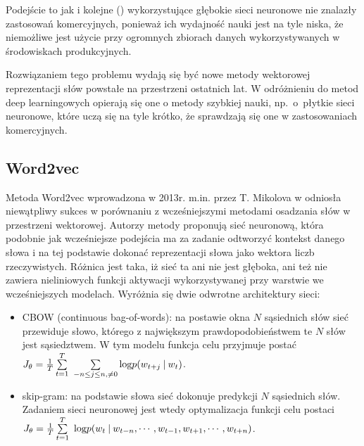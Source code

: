 \documentclass[pl]{minipw} %
\begin{document}
Podejście to jak i kolejne (\cite{c_w}) wykorzystujące głębokie sieci neuronowe nie znalazły zastosowań komercyjnych, ponieważ ich wydajność nauki jest na tyle  niska, że niemożliwe jest użycie przy ogromnych zbiorach danych wykorzystywanych w środowiskach produkcyjnych.


Rozwiązaniem tego problemu wydają się być nowe metody wektorowej reprezentacji słów powstałe na przestrzeni ostatnich lat. W odróżnieniu do metod deep learningowych opierają się one o metody szybkiej nauki, np.~o~płytkie sieci neuronowe, które uczą się na tyle krótko, że sprawdzają się one w zastosowaniach komercyjnych.


\subsection{Word2vec}%

Metoda Word2vec wprowadzona w 2013r. m.in. przez T. Mikolova w \cite{word2vec} odniosła niewątpliwy sukces w porównaniu z wcześniejszymi metodami osadzania słów w przestrzeni wektorowej. Autorzy metody proponują sieć neuronową, która podobnie jak wcześniejsze podejścia ma za zadanie odtworzyć kontekst danego słowa i na tej podstawie dokonać reprezentacji słowa jako wektora liczb rzeczywistych. Różnica jest taka, iż sieć ta ani nie jest głęboka, ani też nie zawiera nieliniowych funkcji aktywacji wykorzystywanej przy warstwie we wcześniejszych modelach. Wyróżnia się dwie odwrotne architektury sieci:
\begin{itemize}
	\item CBOW (continuous bag-of-words): na postawie okna $N$ sąsiednich słów sieć przewiduje słowo, którego z największym prawdopodobieństwem te $N$ słów jest sąsiedztwem. W tym modelu funkcja celu przyjmuje postać $J_\theta = \frac{1}{T}\sum\limits_{t=1}^T\ \sum\limits_{-n \leq j \leq n , \neq 0} \text{log} \space p(w_{t+j} \: | \: w_t)$.
	\item skip-gram: na podstawie słowa sieć dokonuje predykcji $N$ sąsiednich słów. Zadaniem sieci neuronowej jest wtedy optymalizacja funkcji celu postaci $J_\theta = \frac{1}{T}\sum\limits_{t=1}^T\ \text{log} \space p(w_t \: | \: w_{t-n} , \cdots , w_{t-1}, w_{t+1}, \cdots , w_{t+n})$.
\end{itemize}
\end{document}
